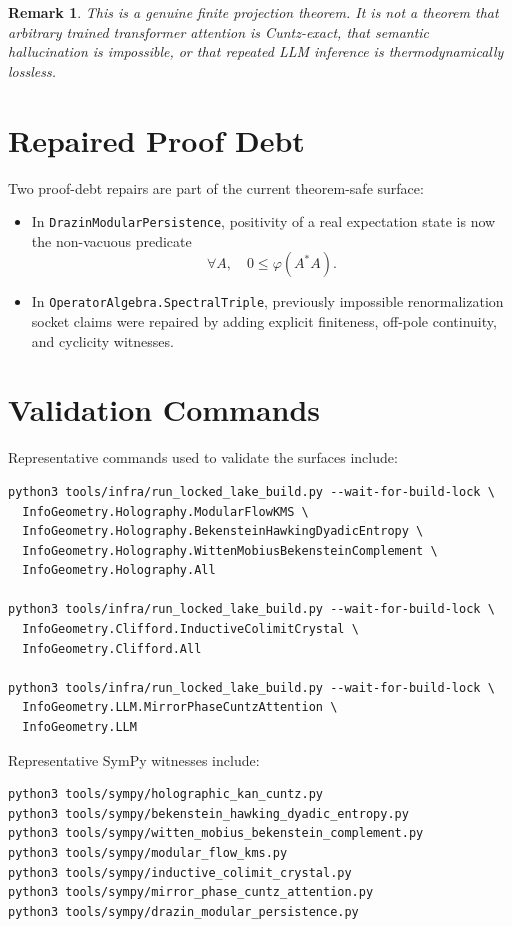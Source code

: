 \documentclass[11pt,a4paper]{article}
\newtheorem{remark}[theorem]{Remark}
\begin{document}
\begin{remark}
This is a genuine finite projection theorem.  It is not a theorem that arbitrary
trained transformer attention is Cuntz-exact, that semantic hallucination is
impossible, or that repeated LLM inference is thermodynamically lossless.
\end{remark}

\section{Repaired Proof Debt}

Two proof-debt repairs are part of the current theorem-safe surface:
\begin{itemize}
  \item In \texttt{DrazinModularPersistence}, positivity of a real expectation
  state is now the non-vacuous predicate
  \begin{equation}
    \forall A,\quad 0 \le \varphi(A^*A).
  \end{equation}
  \item In \texttt{OperatorAlgebra.SpectralTriple}, previously impossible
  renormalization socket claims were repaired by adding explicit finiteness,
  off-pole continuity, and cyclicity witnesses.
\end{itemize}

\section{Validation Commands}

Representative commands used to validate the surfaces include:
\begin{verbatim}
python3 tools/infra/run_locked_lake_build.py --wait-for-build-lock \
  InfoGeometry.Holography.ModularFlowKMS \
  InfoGeometry.Holography.BekensteinHawkingDyadicEntropy \
  InfoGeometry.Holography.WittenMobiusBekensteinComplement \
  InfoGeometry.Holography.All

python3 tools/infra/run_locked_lake_build.py --wait-for-build-lock \
  InfoGeometry.Clifford.InductiveColimitCrystal \
  InfoGeometry.Clifford.All

python3 tools/infra/run_locked_lake_build.py --wait-for-build-lock \
  InfoGeometry.LLM.MirrorPhaseCuntzAttention \
  InfoGeometry.LLM
\end{verbatim}

Representative SymPy witnesses include:
\begin{verbatim}
python3 tools/sympy/holographic_kan_cuntz.py
python3 tools/sympy/bekenstein_hawking_dyadic_entropy.py
python3 tools/sympy/witten_mobius_bekenstein_complement.py
python3 tools/sympy/modular_flow_kms.py
python3 tools/sympy/inductive_colimit_crystal.py
python3 tools/sympy/mirror_phase_cuntz_attention.py
python3 tools/sympy/drazin_modular_persistence.py
\end{verbatim}
\end{document}
